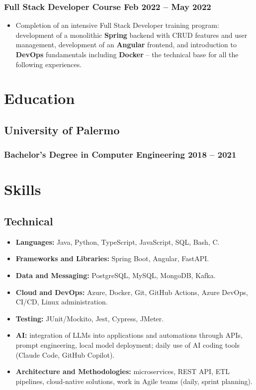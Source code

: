 \documentclass[11pt]{article}
\newcommand{\rside}[1]{
  \hfill {\normalfont\color{accent} #1}%
}
\begin{document}
\subsubsection{Full Stack Developer Course \rside{Feb 2022 -- May 2022}}
\begin{itemize}
  \item Completion of an intensive Full Stack Developer training program: development of a monolithic \textbf{Spring} backend with CRUD features and user management, development of an \textbf{Angular} frontend, and introduction to \textbf{DevOps} fundamentals including \textbf{Docker} -- the technical base for all the following experiences.
\end{itemize}

\section{Education}
\subsection{University of Palermo}
\subsubsection{Bachelor's Degree in Computer Engineering \rside{2018 -- 2021}}
\vspace{1em}

\section{Skills}
\subsection{Technical}
\begin{itemize}
  \item \textbf{Languages:} Java, Python, TypeScript, JavaScript, SQL, Bash, C.
  \item \textbf{Frameworks and Libraries:} Spring Boot, Angular, FastAPI.
  \item \textbf{Data and Messaging:} PostgreSQL, MySQL, MongoDB, Kafka.
  \item \textbf{Cloud and DevOps:} Azure, Docker, Git, GitHub Actions, Azure DevOps, CI/CD, Linux administration.
  \item \textbf{Testing:} JUnit/Mockito, Jest, Cypress, JMeter.
  \item \textbf{AI:} integration of LLMs into applications and automations through APIs, prompt engineering, local model deployment; daily use of AI coding tools (Claude Code, GitHub Copilot).
  \item \textbf{Architecture and Methodologies:} microservices, REST API, ETL pipelines, cloud-native solutions, work in Agile teams (daily, sprint planning).
\end{itemize}
\end{document}
